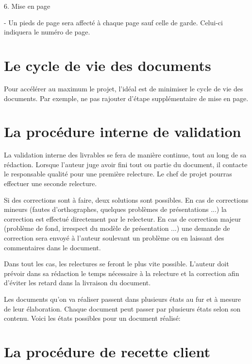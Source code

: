 6. Mise en page

   - Un pieds de page sera affecté à chaque page sauf celle de garde.
     Celui-ci indiquera le numéro de page.

\section{Le cycle de vie des documents}

Pour accélérer au maximum le projet, l’idéal est de minimiser le cycle de vie des documents.
Par exemple, ne pas rajouter d’étape supplémentaire de mise en page.


\section{La procédure interne de validation}

La validation interne des livrables se fera de manière continue, tout au long de sa rédaction.
Lorsque l’auteur juge avoir fini tout ou partie du document, il contacte le responsable qualité pour une première relecture. Le chef de projet pourras effectuer une seconde relecture.

Si des corrections sont à faire, deux solutions sont possibles.
En cas de corrections mineurs (fautes d’orthographes, quelques problèmes de présentations ...) la correction est effectué directement par le relecteur.
En cas de correction majeur (problème de fond, irrespect du modèle de présentation ...) une demande de correction sera envoyé à l’auteur soulevant un problème ou en laissant des commentaires dans le document.

Dans tout les cas, les relectures se feront le plus vite possible.
L’auteur doit prévoir dans sa rédaction le temps nécessaire à la relecture et la correction afin d’éviter les retard dans la livraison du document.

Les documents qu'on va réaliser passent dans plusieurs états au fur et à mesure de leur élaboration. Chaque document peut passer par plusieurs états selon son contenu. Voici les états possibles pour un document réalisé:



\section{La procédure de recette client}

